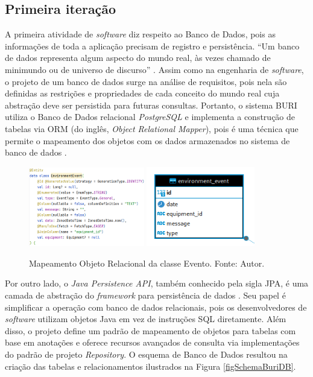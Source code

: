 \subsection{Primeira iteração}\label{ExecAtv1It}

A primeira atividade de \textit{software} diz respeito ao Banco de Dados, pois as informações de toda a aplicação 
precisam de registro e persistência. ``Um banco de dados representa algum aspecto do mundo real, às vezes chamado de minimundo ou de universo de discurso'' \cite[pp. 3]{banco-de-dados-navathe2014}. Assim como na engenharia de \textit{software}, o projeto 
de um banco de dados surge na análise de requisitos, pois nela são definidas as restrições e propriedades de cada conceito do mundo real cuja abstração 
deve ser persistida para futuras consultas. Portanto, o sistema BURI utiliza o Banco de Dados relacional \textit{PostgreSQL} e implementa a construção de tabelas 
via ORM (do inglês, \textit{Object Relational Mapper}), pois é uma técnica que permite o mapeamento dos objetos com os dados armazenados no sistema de banco de dados \cite{hibernate-documentation}. 

\begin{figure}[ht]
    \centering
    \includegraphics[width=0.45\textwidth]{img/event-class-kotlin.png}
    \hfill
    \includegraphics[width=0.42\textwidth]{img/event-table-postgres.png}
    \caption{Mapeamento Objeto Relacional da classe Evento. Fonte: Autor.}\label{figJpaEvent}
\end{figure}

Por outro lado, o \textit{Java Persistence API}, também conhecido pela sigla JPA, é uma camada 
de abstração do \textit{framework} para persistência de dados \cite{spring-data-jpa-documentation}. Seu papel 
é simplificar a operação com banco de dados relacionais, pois os desenvolvedores de \textit{software} utilizam objetos Java 
em vez de instruções SQL diretamente. Além disso, o projeto define um padrão de mapeamento de objetos para tabelas com base em anotações e
oferece recursos avançados de consulta via implementações do padrão de projeto \textit{Repository}. O esquema de Banco de Dados resultou na criação das 
tabelas e relacionamentos ilustrados na Figura \ref{figSchemaBuriDB}.

